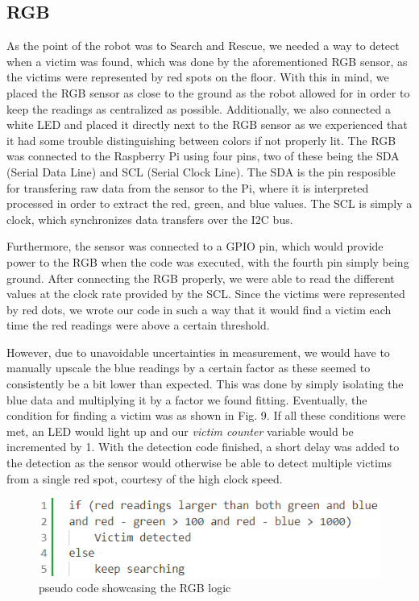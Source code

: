 \documentclass[conference]{IEEEtran}
\begin{document}
\subsection{RGB}
As the point of the robot was to Search and Rescue, we needed a way to detect when a victim was found, which was done by the aforementioned RGB sensor, as the victims were represented by red spots on the floor.
With this in mind, we placed the RGB sensor as close to the ground as the robot allowed for in order to keep the readings as centralized as possible.
Additionally, we also connected a white LED and placed it directly next to the RGB sensor as we experienced that it had some trouble distinguishing between colors if not properly lit.
The RGB was connected to the Raspberry Pi using four pins, two of these being the SDA (Serial Data Line) and SCL (Serial Clock Line)\cite{b4}. The SDA is the pin resposible for transfering raw data from the sensor to the Pi, where it is interpreted processed in order to extract the red, green, and blue values.
The SCL is simply a clock, which synchronizes data transfers over the I2C bus.

Furthermore, the sensor was connected to a GPIO pin, which would provide power to the RGB when the code was executed, with the fourth pin simply being ground.
After connecting the RGB properly, we were able to read the different values at the clock rate provided by the SCL.
Since the victims were represented by red dots, we wrote our code in such a way that it would find a victim each time the red readings were above a certain threshold.

However, due to unavoidable uncertainties in measurement, we would have to manually upscale the blue readings by a certain factor as these seemed to consistently be a bit lower than expected.
This was done by simply isolating the blue data and multiplying it by a factor we found fitting.
Eventually, the condition for finding a victim was as shown in Fig. 9.
If all these conditions were met, an LED would light up and our \textit{victim counter} variable would be incremented by 1.
With the detection code finished, a short delay was added to the detection as the sensor would otherwise be able to detect multiple victims from a single red spot, courtesy of the high clock speed.

\begin{figure}[htbp]
    \centerline{\includegraphics[width=0.9\columnwidth]{Pictures/rgbpseudo.png}}
    \caption{pseudo code showcasing the RGB logic}
    \label{sec:rgb}
    \end{figure}
\end{document}
